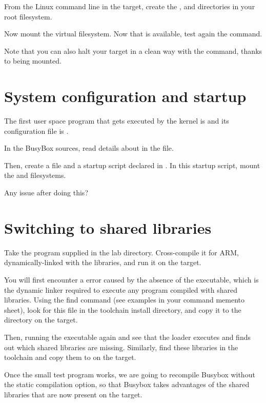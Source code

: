 From the Linux command line in the target, create the ,  and
 directories in your root filesystem.

Now mount the  virtual filesystem. Now that  is
available, test again the  command.

Note that you can also halt your target in a clean way with the 
command, thanks to  being mounted.

\section{System configuration and startup}

The first user space program that gets executed by the kernel is
 and its configuration file is .

In the BusyBox sources, read details about  in the
 file.

Then, create a  file and a 
startup script declared in . In this startup
script, mount the  and  filesystems.

Any issue after doing this?

\section{Switching to shared libraries}

Take the  program supplied in the lab 
directory. Cross-compile it for ARM, dynamically-linked with the
libraries, and run it on the target.

You will first encounter a  error caused by the absence of
the  executable, which is the dynamic linker
required to execute any program compiled with shared libraries. Using
the find command (see examples in your command memento sheet), look
for this file in the toolchain install directory, and copy it to the
 directory on the target.

Then, running the executable again and see that the loader executes
and finds out which shared libraries are missing. Similarly, find
these libraries in the toolchain and copy them to  on the
target.

Once the small test program works, we are going to recompile Busybox
without the static compilation option, so that Busybox takes advantages of the
shared libraries that are now present on the target.

